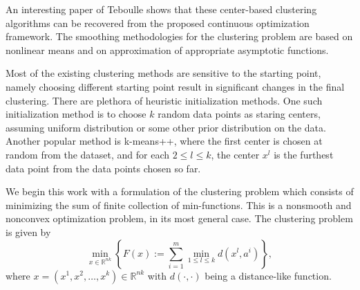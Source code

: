 \documentclass[12pt]{article}
\numberwithin{equation}{section}
\newcommand{\rr}{\mathbb{R}} %
\begin{document}
An interesting paper of Teboulle \cite{T2007} shows that these center-based clustering algorithms can be recovered from the proposed continuous optimization framework. The smoothing methodologies for the clustering problem are based on nonlinear means and on approximation of appropriate asymptotic functions.

Most of the existing clustering methods are sensitive to the starting point, namely choosing different starting point result in significant changes in the final clustering. There are plethora of heuristic initialization methods. One such initialization method is to choose $k$ random data points as staring centers, assuming uniform distribution or some other prior distribution on the data. Another popular method is k-means++, where the first center is chosen at random from the dataset, and for each $2 \leq l \leq k$, the center $x^l$ is the furthest data point from the data points chosen so far.

%

We begin this work with a formulation of the clustering problem which consists of minimizing the sum of finite collection of min-functions. This is a nonsmooth and nonconvex optimization problem, in its most general case. The clustering problem is given by
\begin{equation}
	\min\limits_{x \in \mathbb{R}^{nk}} \left\lbrace F(x) := \sum\limits_{i=1}^{m} \min\limits_{1 \le l \le k} d(x^l,a^i) \right\rbrace , \label{StateEq1}
\end{equation}
where $x=\left( x^1,x^2, \ldots, x^k \right) \in \rr^{nk}$ with $\textit{d}(\cdot ,\cdot)$ being a distance-like function.
\end{document}
